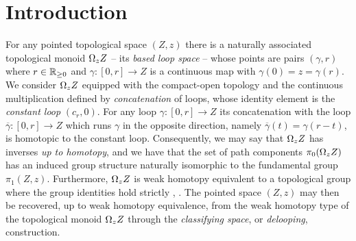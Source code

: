 
\section{Introduction}

For any pointed topological space $(Z,z)$ there is a naturally associated topological monoid $\Omega_z Z$ -- its \textit{based loop space} -- whose points are pairs $(\gamma, r)$ where $r \in \mathbb{R}_{\geq 0}$ and $\gamma \colon [0,r] \to Z$ is a continuous map with $\gamma(0) = z = \gamma(r)$.
We consider $\Omega_z Z$  equipped with the compact-open topology and the continuous multiplication defined by \textit{concatenation} of loops, whose identity element is the \textit{constant loop} $(c_r,0)$.
For any loop $\gamma \colon [0,r] \to Z $ its concatenation with the loop $\overline{\gamma} \colon [0,r] \to Z$ which runs $\gamma$ in the opposite direction, namely $\overline{\gamma}(t) = \gamma(r-t)$, is homotopic to the constant loop.
Consequently, we may say that $\Omega_z Z$ has inverses \textit{up to homotopy}, and we have that the set of path components $\pi_0(\Omega_z Z)$ has an induced group structure naturally isomorphic to the fundamental group $\pi_1(Z,z)$.
Furthermore, $\Omega_z Z$ is weak homotopy equivalent to a topological group where the group identities hold strictly \cite{milnor1956bundles}, \cite{berger1995loops}.
The pointed space $(Z,z)$ may then be recovered, up to weak homotopy equivalence, from the weak homotopy type of the topological monoid $\Omega_z Z$ through the \textit{classifying space}, or \textit{delooping}, construction.


